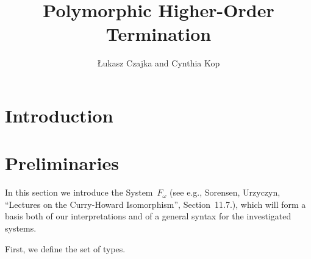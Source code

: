 \documentclass[runningheads,a4paper]{llncs}
\begin{document}
\mainmatter

\title{Polymorphic Higher-Order Termination}

\author{{\L}ukasz Czajka and Cynthia Kop}

\maketitle

\begin{abstract}
\end{abstract}

\section{Introduction}

\section{Preliminaries}

In this section we introduce the System~$F_\omega$ (see e.g.,
Sorensen, Urzyczyn, ``Lectures on the Curry-Howard Isomorphism'',
Section~11.7.), which will form a basis both of our interpretations
and of a general syntax for the investigated systems.

First, we define the set of types.
\end{document}
